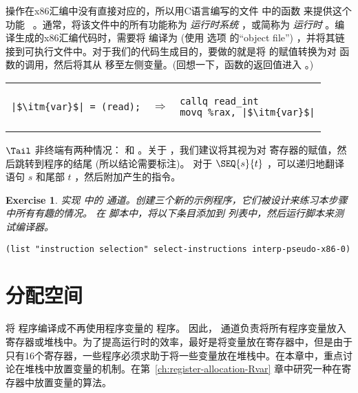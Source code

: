 \documentclass[11pt]{book}
\newtheorem{exercise}[theorem]{Exercise}
\begin{document}
  操作在x86汇编中没有直接对应的，所以用C语言编写的文件  中的函数
 来提供这个功能~\citep{Kernighan:1988nx} 。通常，将该文件中的所有功能称为 \emph{运行时系统} ，或简称为 \emph{运行时} 。编译生成的x86汇编代码时，需要将  编译为
 (使用  选项
 的``object file'') ，并将其链接到可执行文件中。对于我们的代码生成目的，要做的就是将
 的赋值转换为对  函数的调用，然后将其从  移至左侧变量。(回想一下，函数的返回值进入  。)  \\
\begin{tabular}{lll}
\begin{minipage}{0.3\textwidth}
\begin{lstlisting}
|$\itm{var}$| = (read);
\end{lstlisting}
\end{minipage}
&
$\Rightarrow$
&
\begin{minipage}{0.3\textwidth}
\begin{lstlisting}
callq read_int
movq %rax, |$\itm{var}$|
\end{lstlisting}
\end{minipage}
\end{tabular} 

 $\Tail$ 非终端有两种情况：  和
 。关于  ，我们建议将其视为对  寄存器的赋值，然后跳转到程序的结尾 (所以结论需要标注)。
对于 $\SEQ{s}{t}$ ，可以递归地翻译语句 $s$ 和尾部 $t$
，然后附加产生的指令。

\begin{exercise}
\normalfont 实现 中的  通道。创建三个新的示例程序，它们被设计来练习本步骤中所有有趣的情况。
%
在  脚本中，将以下条目添加到  列表中，然后运行脚本来测试编译器。
\begin{lstlisting}
(list "instruction selection" select-instructions interp-pseudo-x86-0)
\end{lstlisting}
\end{exercise}


\section{分配空间}
\label{sec:assign-Rvar}

  将 \LangXVar{} 程序编译成不再使用程序变量的
\LangXVar{} 程序。
因此，  通道负责将所有程序变量放入寄存器或堆栈中。为了提高运行时的效率，最好是将变量放在寄存器中，但是由于只有16个寄存器，一些程序必须求助于将一些变量放在堆栈中。在本章中，重点讨论在堆栈中放置变量的机制。在第~\ref{ch:register-allocation-Rvar} 章中研究一种在寄存器中放置变量的算法。
\end{document}
